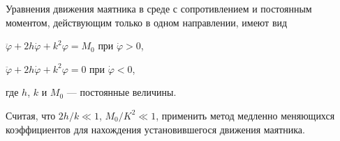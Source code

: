 Уравнения движения маятника в среде с сопротивлением и постоянным моментом,
действующим только в одном направлении, имеют вид
\begin{description}
	\item $\ddot{\varphi} + 2h\dot{\varphi} + k^2\varphi = M_0$
	при $\dot{\varphi} > 0$,
	\item $\ddot{\varphi} + 2h\dot{\varphi} + k^2\varphi = 0$
	при $\dot{\varphi} < 0$,
\end{description}
где $h$, $k$ и $M_0$ --- постоянные величины.

Считая, что $2h/k \ll 1$, $M_0 /K^2 \ll 1$,
применить метод медленно меняющихся коэффициентов
для нахождения установившегося движения маятника.
